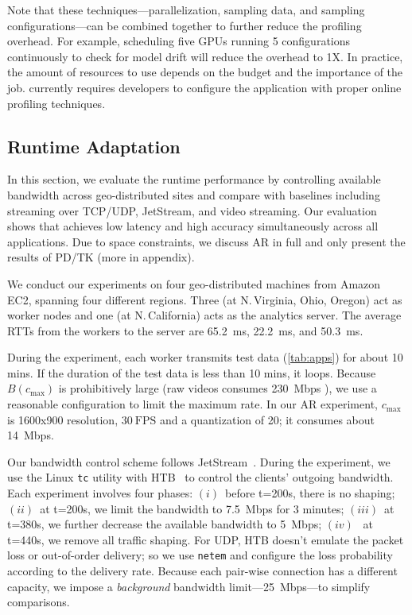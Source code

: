 Note that these techniques---parallelization, sampling data, and sampling
configurations---can be combined together to further reduce the profiling
overhead. For example, scheduling five GPUs running 5 configurations
continuously to check for model drift will reduce the overhead to 1X\@. In
practice, the amount of resources to use depends on the budget and the
importance of the job. \sysname{} currently requires developers to configure the
application with proper online profiling techniques.


\subsection{Runtime Adaptation}
\label{sec:runtime-adaptation}

In this section, we evaluate the runtime performance by controlling available
bandwidth across geo-distributed sites and compare \sysname{} with baselines
including streaming over TCP/UDP, JetStream, and video streaming. Our evaluation
shows that \sysname{} achieves low latency and high accuracy simultaneously
across all applications. Due to space constraints, we discuss AR in full and
only present the results of PD/TK (more in appendix).

 We conduct our experiments on four geo-distributed
machines from Amazon EC2, spanning four different regions. Three (at
N.\,Virginia, Ohio, Oregon) act as worker nodes and one (at N.\,California) acts
as the analytics server. The average RTTs from the workers to the server are
\SI{65.2}{\ms}, \SI{22.2}{\ms}, and \SI{50.3}{ms}.

During the experiment, each worker transmits test data (\autoref{tab:apps}) for
about 10 mins. If the duration of the test data is less than 10 mins, it
loops. Because $B(c_{\max})$ is prohibitively large (raw videos consumes
\SI{230}{Mbps} ), we use a reasonable configuration to limit the maximum
rate. In our AR experiment, $c_{\max}$ is 1600x900 resolution, \(30~\text{FPS}\)
and a quantization of 20; it consumes about \SI{14}{Mbps}.

Our bandwidth control scheme follows
JetStream~\cite{rabkin2014aggregation}. During the experiment, we use the Linux
\texttt{tc} utility with HTB~\cite{htb, lartc} to control the clients' outgoing
bandwidth. Each experiment involves four phases: $(i)$~before t=200s, there is
no shaping; $(ii)$~at t=200s, we limit the bandwidth to \SI{7.5}{Mbps} for 3
minutes; $(iii)$~at t=380s, we further decrease the available bandwidth to
\SI{5}{Mbps}; $(iv)$~ at t=440s, we remove all traffic shaping. For UDP, HTB
doesn't emulate the packet loss or out-of-order delivery; so we use
\texttt{netem} and configure the loss probability according to the delivery
rate. Because each pair-wise connection has a different capacity, we impose a
\textit{background} bandwidth limit---\SI{25}{Mbps}---to simplify comparisons.

